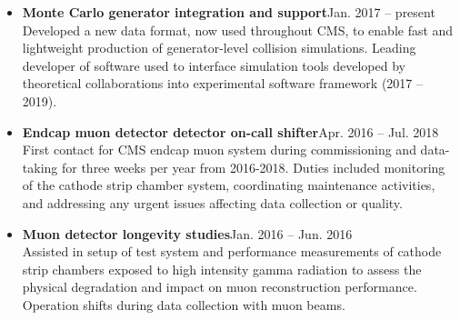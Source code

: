 \documentclass[10pt]{res} %
\begin{document}
\begin{resume}
\begin{itemize}
  \item\textbf{Monte Carlo generator integration and support}\hfill{Jan. 2017 -- present} \\
    Developed a new data format, now used throughout CMS, to enable fast and lightweight production
    of generator-level collision simulations.
    Leading developer of software used to interface simulation tools
    developed by theoretical collaborations into experimental software framework (2017 -- 2019).

  \item\textbf{Endcap muon detector detector on-call shifter}\hfill{Apr. 2016 -- Jul. 2018} \\
    First contact for CMS endcap muon system during commissioning and data-taking for three weeks per year
    from 2016-2018. Duties included monitoring of the cathode strip chamber system, coordinating maintenance activities,
    and addressing any urgent issues affecting data collection or quality.

  \item\textbf{Muon detector longevity studies}\hfill{Jan. 2016 -- Jun. 2016} \\
    Assisted in setup of test system and performance measurements of cathode strip chambers
    exposed to high intensity gamma radiation to assess the physical degradation and impact on muon
    reconstruction performance. Operation shifts during data collection with muon beams.
\end{itemize}


\end{resume}
\end{document}
